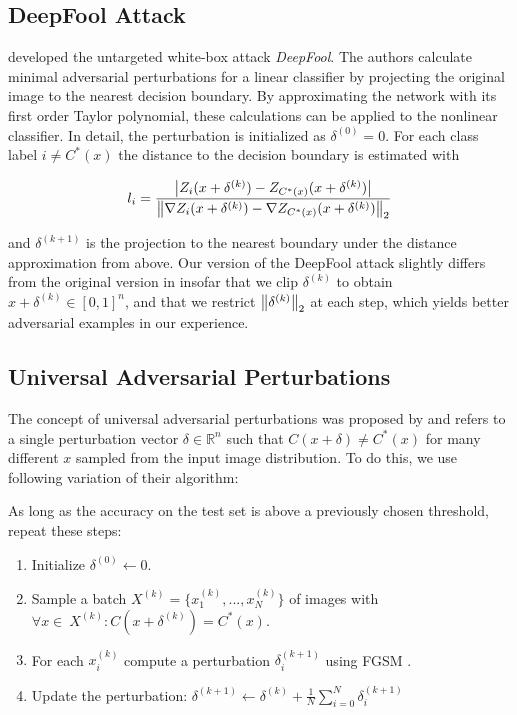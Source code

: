 \subsection{DeepFool Attack}

\citet{deepfool} developed the untargeted white-box attack \emph{DeepFool}.
The authors calculate minimal adversarial perturbations for a linear classifier by projecting the original image to the nearest decision boundary.
By approximating the network with its first order Taylor polynomial, these calculations can be applied to the nonlinear classifier.
In detail, the perturbation is initialized as $\delta^{(0)} = 0$.
For each class label $i \neq C^*(x)$ the distance to the decision boundary is estimated with

\begin{equation}
l_i = 
\frac{
	\left \lvert Z_i(x + \delta^{(k)}) - Z_{C^*(x)}(x + \delta^{(k)}) \right \rvert
}
{
	\left \lVert \nabla Z_i(x + \delta^{(k)}) - \nabla Z_{C^*(x)}(x + \delta^{(k)}) \right \rVert _{2}
}
\end{equation}


and $\delta^{(k+1)}$ is the projection to the nearest boundary under the distance approximation from above.
Our version of the DeepFool attack slightly differs from the original version in insofar that we clip $\delta^{(k)}$ to obtain $x + \delta^{(k)} \in [0,1]^n$, and that we restrict $\left \lVert \delta^{(k)} \right \rVert _{2}$ at each step, which yields better adversarial examples in our experience.

\subsection{Universal Adversarial Perturbations}

The concept of universal adversarial perturbations was proposed by \citet{universal} and refers to a single perturbation vector $\delta \in \mathbb{R}^n$ such that $C(x + \delta) \neq C^*(x)$ for many different $x$ sampled from the input image distribution.
To do this, we use following variation of their algorithm:

As long as the accuracy on the test set is above a previously chosen threshold, repeat these steps:
\begin{enumerate}
	\item Initialize $\delta^{(0)} \gets 0$.
	\item Sample a batch $X^{(k)} = \{x_1^{(k)}, ..., x_N^{(k)}\}$ of images with $\forall x \in\ X^{(k)}:  C(x + \delta^{(k)}) = C^*(x)$.
	\item For each $x_i^{(k)}$ compute a perturbation $\delta_i^{(k+1)}$ using FGSM \citep{fgsm}.
	\item Update the perturbation: $\delta^{(k+1)} \gets \delta^{(k)} + \frac{1}{N} \sum\limits_{i=0}^N \delta_i^{(k+1)}$
\end{enumerate}

